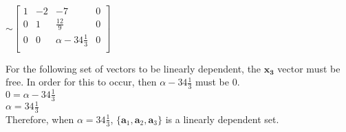 \documentclass{report}
\begin{document}
$\sim \begin{bmatrix}
    1 & -2 & -7 & 0 \\
    0 & 1 & \frac{12}{9} & 0 \\
    0 & 0 & \alpha-34\frac{1}{3} & 0 \\
\end{bmatrix}$\\
\begin{center}
For the following set of vectors to be linearly dependent, the $\mathbf{x_3}$ vector must be free. In order for this to occur, then $\alpha - 34\frac{1}{3}$ must be 0.\\\vspace{3mm}
$0 = \alpha - 34\frac{1}{3}$\\
$\alpha = 34\frac{1}{3}$\\\vspace{3mm}
Therefore, when $\alpha = 34\frac{1}{3}$, $\{\mathbf{a}_1, \mathbf{a}_2, \mathbf{a}_3\}$ is a linearly dependent set.
\end{center}
\clearpage
\end{document}
